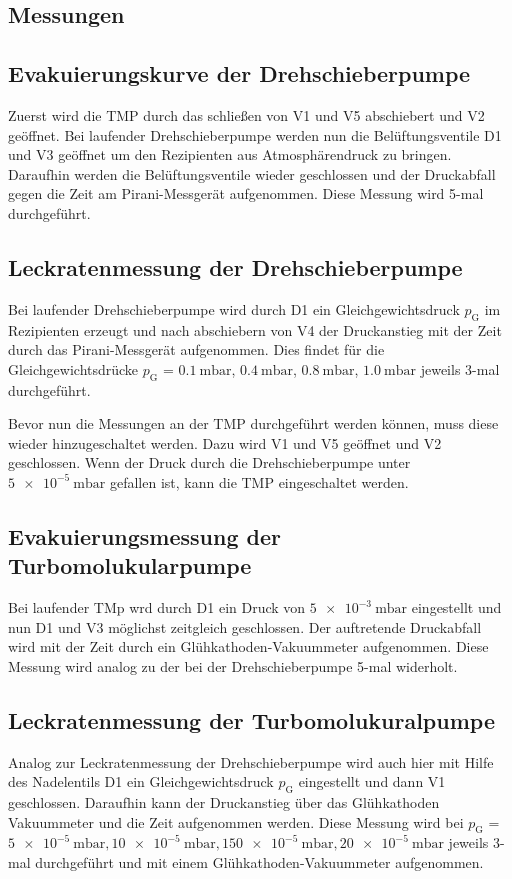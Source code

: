 \subsection{Messungen}
\subsection{Evakuierungskurve der Drehschieberpumpe}
Zuerst wird die TMP durch das schließen von V1 und V5 abschiebert und V2 geöffnet.
Bei laufender Drehschieberpumpe werden nun die Belüftungsventile D1 und V3 geöffnet
um den Rezipienten aus Atmosphärendruck zu bringen. Daraufhin werden die Belüftungsventile
wieder geschlossen und der Druckabfall gegen die Zeit am Pirani-Messgerät aufgenommen.
Diese Messung wird 5-mal durchgeführt.
\subsection{Leckratenmessung der Drehschieberpumpe}
Bei laufender Drehschieberpumpe wird durch D1 ein Gleichgewichtsdruck $p_\text{G}$
im Rezipienten erzeugt und nach abschiebern von V4 der Druckanstieg mit der Zeit durch
das Pirani-Messgerät aufgenommen. Dies findet für die Gleichgewichtsdrücke
$p_\text{G}$ = {$\SI{0.1}{\milli\bar}$, $\SI{0.4}{\milli\bar}$, $\SI{0.8}{\milli\bar}$,
$\SI{1.0}{\milli\bar}$} jeweils 3-mal durchgeführt.

Bevor nun die Messungen an der TMP durchgeführt werden können, muss diese wieder
hinzugeschaltet werden. Dazu wird V1 und V5 geöffnet und V2 geschlossen. Wenn der
Druck durch die Drehschieberpumpe unter $\SI{5e-5}{\milli\bar}$ gefallen ist, kann
die TMP eingeschaltet werden.
\subsection{Evakuierungsmessung der Turbomolukularpumpe}
Bei laufender TMp wrd durch D1 ein Druck von $\SI{5e-3}{\milli\bar}$ eingestellt
und nun D1 und V3 möglichst zeitgleich geschlossen. Der auftretende Druckabfall
wird mit der Zeit durch ein Glühkathoden-Vakuummeter aufgenommen. Diese Messung
wird analog zu der bei der Drehschieberpumpe 5-mal widerholt.
\subsection{Leckratenmessung der Turbomolukuralpumpe}
Analog zur Leckratenmessung  der Drehschieberpumpe wird auch hier mit Hilfe des Nadelentils
D1 ein Gleichgewichtsdruck $p_\text{G}$ eingestellt und dann V1 geschlossen. Daraufhin
kann der Druckanstieg über das Glühkathoden Vakuummeter und die Zeit aufgenommen werden.
Diese Messung wird bei $p_\text{G}$ = ${\SI{5e-5}{\milli\bar}, \SI{10e-5}{\milli\bar},
\SI{150e-5}{\milli\bar}, \SI{20e-5}{\milli\bar}}$ jeweils 3-mal durchgeführt und mit einem
Glühkathoden-Vakuummeter aufgenommen.

